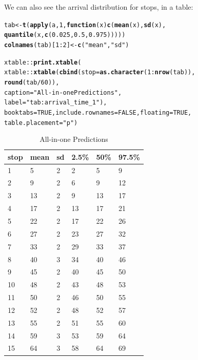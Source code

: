 \documentclass[11pt]{article}\usepackage[]{graphicx}\usepackage[]{color}
\makeatletter
\newcommand{\hlnum}[1]{\textcolor[rgb]{0.686,0.059,0.569}{#1}}%
\newcommand{\hlstr}[1]{\textcolor[rgb]{0.192,0.494,0.8}{#1}}%
\newcommand{\hlopt}[1]{\textcolor[rgb]{0,0,0}{#1}}%
\newcommand{\hlstd}[1]{\textcolor[rgb]{0.345,0.345,0.345}{#1}}%
\newcommand{\hlkwa}[1]{\textcolor[rgb]{0.161,0.373,0.58}{\textbf{#1}}}%
\newcommand{\hlkwb}[1]{\textcolor[rgb]{0.69,0.353,0.396}{#1}}%
\newcommand{\hlkwc}[1]{\textcolor[rgb]{0.333,0.667,0.333}{#1}}%
\newcommand{\hlkwd}[1]{\textcolor[rgb]{0.737,0.353,0.396}{\textbf{#1}}}%
\newenvironment{kframe}{%
 \def\at@end@of@kframe{}%
 \ifinner\ifhmode%
  \def\at@end@of@kframe{\end{minipage}}%
  \begin{minipage}{\columnwidth}%
 \fi\fi%
 \def\FrameCommand##1{\hskip\@totalleftmargin \hskip-\fboxsep
 \colorbox{shadecolor}{##1}\hskip-\fboxsep
     \hskip-\linewidth \hskip-\@totalleftmargin \hskip\columnwidth}%
 \MakeFramed {\advance\hsize-\width
   \@totalleftmargin\z@ \linewidth\hsize
   \@setminipage}}%
 {\par\unskip\endMakeFramed%
 \at@end@of@kframe}
\makeatother
\begin{document}
We can also see the arrival distribution for stops, in a table:
\begin{kframe}
\begin{alltt}
\hlstd{tab} \hlkwb{<-} \hlkwd{t}\hlstd{(}\hlkwd{apply}\hlstd{(a,} \hlnum{1}\hlstd{,} \hlkwa{function}\hlstd{(}\hlkwc{x}\hlstd{)} \hlkwd{c}\hlstd{(}\hlkwd{mean}\hlstd{(x),} \hlkwd{sd}\hlstd{(x),}
                                   \hlkwd{quantile}\hlstd{(x,} \hlkwd{c}\hlstd{(}\hlnum{0.025}\hlstd{,} \hlnum{0.5}\hlstd{,} \hlnum{0.975}\hlstd{)))))}
\hlkwd{colnames}\hlstd{(tab)[}\hlnum{1}\hlopt{:}\hlnum{2}\hlstd{]} \hlkwb{<-} \hlkwd{c}\hlstd{(}\hlstr{"mean"}\hlstd{,} \hlstr{"sd"}\hlstd{)}

\hlstd{xtable}\hlopt{::}\hlkwd{print.xtable}\hlstd{(}
    \hlstd{xtable}\hlopt{::}\hlkwd{xtable}\hlstd{(}\hlkwd{cbind}\hlstd{(}\hlkwc{stop} \hlstd{=} \hlkwd{as.character}\hlstd{(}\hlnum{1}\hlopt{:}\hlkwd{nrow}\hlstd{(tab)),}
                         \hlkwd{round}\hlstd{(tab} \hlopt{/} \hlnum{60}\hlstd{)),}
                   \hlkwc{caption} \hlstd{=} \hlstr{"All-in-one Predictions"}\hlstd{,}
                   \hlkwc{label} \hlstd{=} \hlstr{"tab:arrival_time_1"}\hlstd{),}
    \hlkwc{booktabs} \hlstd{=} \hlnum{TRUE}\hlstd{,} \hlkwc{include.rownames} \hlstd{=} \hlnum{FALSE}\hlstd{,} \hlkwc{floating} \hlstd{=} \hlnum{TRUE}\hlstd{,}
    \hlkwc{table.placement} \hlstd{=} \hlstr{"p"}\hlstd{)}
\end{alltt}
\end{kframe}%
\begin{table}[p]
\centering
\begin{tabular}{llllll}
  \toprule
stop & mean & sd & 2.5\% & 50\% & 97.5\% \\ 
  \midrule
1 & 5 & 2 & 2 & 5 & 9 \\ 
  2 & 9 & 2 & 6 & 9 & 12 \\ 
  3 & 13 & 2 & 9 & 13 & 17 \\ 
  4 & 17 & 2 & 13 & 17 & 21 \\ 
  5 & 22 & 2 & 17 & 22 & 26 \\ 
  6 & 27 & 2 & 23 & 27 & 32 \\ 
  7 & 33 & 2 & 29 & 33 & 37 \\ 
  8 & 40 & 3 & 34 & 40 & 46 \\ 
  9 & 45 & 2 & 40 & 45 & 50 \\ 
  10 & 48 & 2 & 43 & 48 & 53 \\ 
  11 & 50 & 2 & 46 & 50 & 55 \\ 
  12 & 52 & 2 & 48 & 52 & 57 \\ 
  13 & 55 & 2 & 51 & 55 & 60 \\ 
  14 & 59 & 3 & 53 & 59 & 64 \\ 
  15 & 64 & 3 & 58 & 64 & 69 \\ 
   \bottomrule
\end{tabular}
\caption{All-in-one Predictions} 
\label{tab:arrival_time_1}
\end{table}
\end{document}
